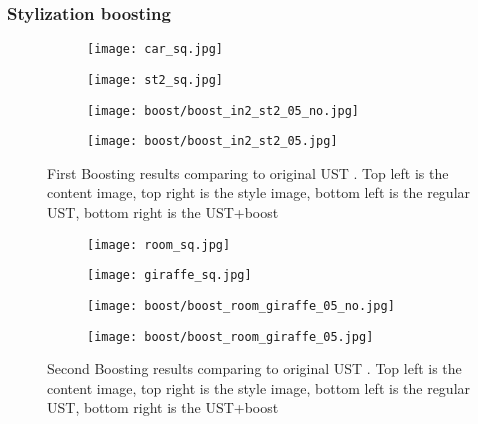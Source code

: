 \subsubsection{Stylization boosting}
\begin{figure}[H]
	\centering
	\begin{subfigure}[b]{0.4\linewidth}
		\texttt{[image: car\_sq.jpg]} %
	\end{subfigure}
	\begin{subfigure}[b]{0.4\linewidth}
		\texttt{[image: st2\_sq.jpg]} %
	\end{subfigure}
	\begin{subfigure}[b]{0.4\linewidth}
		\texttt{[image: boost/boost\_in2\_st2\_05\_no.jpg]} %
	\end{subfigure}
	\begin{subfigure}[b]{0.4\linewidth}
		\texttt{[image: boost/boost\_in2\_st2\_05.jpg]} %
	\end{subfigure}
	\caption{First Boosting results comparing to original UST \cite{bib11}. Top left is the content image, top right is the style image, bottom left is the regular UST, bottom right is the UST+boost}
	\label{fig:Boost1}
\end{figure}
\begin{figure}[H]
	\centering
	\begin{subfigure}[b]{0.4\linewidth}
		\texttt{[image: room\_sq.jpg]} %
	\end{subfigure}
	\begin{subfigure}[b]{0.4\linewidth}
		\texttt{[image: giraffe\_sq.jpg]} %
	\end{subfigure}
	\begin{subfigure}[b]{0.4\linewidth}
		\texttt{[image: boost/boost\_room\_giraffe\_05\_no.jpg]} %
	\end{subfigure}
	\begin{subfigure}[b]{0.4\linewidth}
		\texttt{[image: boost/boost\_room\_giraffe\_05.jpg]} %
	\end{subfigure}
	\caption{Second Boosting results comparing to original UST \cite{bib11}. Top left is the content image, top right is the style image, bottom left is the regular UST, bottom right is the UST+boost}
	\label{fig:Boost2}
\end{figure}
